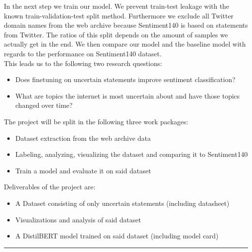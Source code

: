 \documentclass[a4paper,12pt,numbers=enddot]{scrartcl}
\begin{document}
In the next step we train our model. We prevent train-test leakage with the known train-validation-test split method. Furthermore we exclude all Twitter domain names from the web archive because Sentiment140 is based on statements from Twitter. The ratios of this split depends on the amount of samples we actually get in the end. We then compare our model and the baseline model with regards to the performance on Sentiment140 dataset.
\\

\clearpage
This leads us to the following two research questions:
\begin{itemize}
	\setlength\itemsep{-5pt}
	\item Does finetuning on uncertain statements improve sentiment classification?
	\item What are topics the internet is most uncertain about and have those topics changed over time?
\end{itemize}

The project will be split in the following three work packages:
\begin{itemize}
	\setlength\itemsep{-5pt}
	\item Dataset extraction from the web archive data
	\item Labeling, analyzing, visualizing the dataset and comparing it to Sentiment140
	\item Train a model and evaluate it on said dataset
\end{itemize}

Deliverables of the project are:
\begin{itemize}
	\setlength\itemsep{-5pt}
	\item A Dataset consisting of only uncertain statements (including datasheet)
	\item Visualizations and analysis of said dataset
	\item A DistilBERT model trained on said dataset (including model card)
\end{itemize}
\medskip

\hrule
\vspace{-2.5em}
\renewcommand{\refname}{}
\nocite{*}

\end{document}
